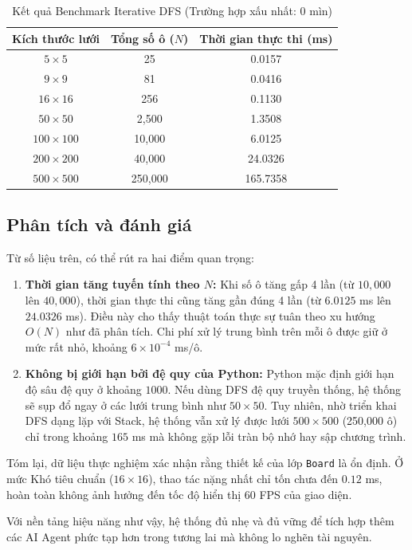 \begin{table}[H]
\centering
\caption{Kết quả Benchmark Iterative DFS (Trường hợp xấu nhất: 0 mìn)}
\begin{tabular}{@{}ccc@{}}
\toprule
\textbf{Kích thước lưới} & \textbf{Tổng số ô ($N$)} & \textbf{Thời gian thực thi (ms)} \\ \midrule
$5 \times 5$     & 25       & 0.0157 \\
$9 \times 9$     & 81       & 0.0416 \\
$16 \times 16$   & 256      & 0.1130 \\
$50 \times 50$   & 2,500    & 1.3508 \\
$100 \times 100$ & 10,000   & 6.0125 \\
$200 \times 200$ & 40,000   & 24.0326 \\
$500 \times 500$ & 250,000  & 165.7358 \\ 
\bottomrule
\end{tabular}
\end{table}

\subsection{Phân tích và đánh giá}

Từ số liệu trên, có thể rút ra hai điểm quan trọng:

\begin{enumerate}
    \item \textbf{Thời gian tăng tuyến tính theo $N$:}  
    Khi số ô tăng gấp 4 lần (từ $10,000$ lên $40,000$), thời gian thực thi cũng tăng gần đúng 4 lần (từ $6.0125$ ms lên $24.0326$ ms). Điều này cho thấy thuật toán thực sự tuân theo xu hướng $O(N)$ như đã phân tích.  
    Chi phí xử lý trung bình trên mỗi ô được giữ ở mức rất nhỏ, khoảng $6 \times 10^{-4}$ ms/ô.
    
    \item \textbf{Không bị giới hạn bởi đệ quy của Python:}  
    Python mặc định giới hạn độ sâu đệ quy ở khoảng $1000$. Nếu dùng DFS đệ quy truyền thống, hệ thống sẽ sụp đổ ngay ở các lưới trung bình như $50 \times 50$.  
    Tuy nhiên, nhờ triển khai DFS dạng lặp với Stack, hệ thống vẫn xử lý được lưới $500 \times 500$ (250,000 ô) chỉ trong khoảng $165$ ms mà không gặp lỗi tràn bộ nhớ hay sập chương trình.
\end{enumerate}

Tóm lại, dữ liệu thực nghiệm xác nhận rằng thiết kế của lớp \texttt{Board} là ổn định. Ở mức Khó tiêu chuẩn ($16 \times 16$), thao tác nặng nhất chỉ tốn chưa đến $0.12$ ms, hoàn toàn không ảnh hưởng đến tốc độ hiển thị 60 FPS của giao diện.

Với nền tảng hiệu năng như vậy, hệ thống đủ nhẹ và đủ vững để tích hợp thêm các AI Agent phức tạp hơn trong tương lai mà không lo nghẽn tài nguyên.